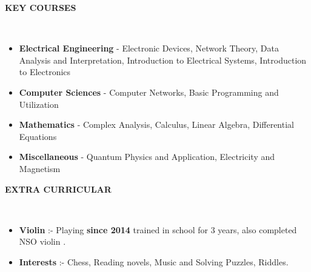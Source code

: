 \documentclass[a4paper,10pt]{article}
\newcommand{\lsep}{-0.5cm}
\newcommand{\resheading}[1]{{\small \colorbox{mygrey}{\begin{minipage}{0.975\textwidth}{\textbf{#1 \vphantom{p\^{E}}}}\end{minipage}}}}
\begin{document}
\resheading{\textbf{KEY COURSES} }\\[\lsep]
\begin{itemize}
\setlength\itemsep{0.1em}
\item \noindent \textbf{Electrical Engineering} - Electronic Devices, Network Theory, Data Analysis and Interpretation, Introduction to Electrical Systems, Introduction to Electronics
\item \noindent \textbf{Computer Sciences} - Computer Networks, Basic Programming and Utilization
\item \noindent \textbf{Mathematics} - Complex Analysis, Calculus, Linear Algebra, Differential Equations
\item \noindent \textbf{Miscellaneous} - Quantum Physics and Application, Electricity and Magnetism

\end{itemize}

\resheading{\textbf{EXTRA CURRICULAR} }\\[\lsep]
\begin{itemize}
\setlength\itemsep{0.1em}
\item \textbf {Violin} :- Playing \textbf{since 2014} trained in school for 3 years, also completed NSO violin .
\item \textbf {Interests} :- Chess, Reading novels, Music and Solving Puzzles, Riddles.

\end{itemize}
\end{document}

